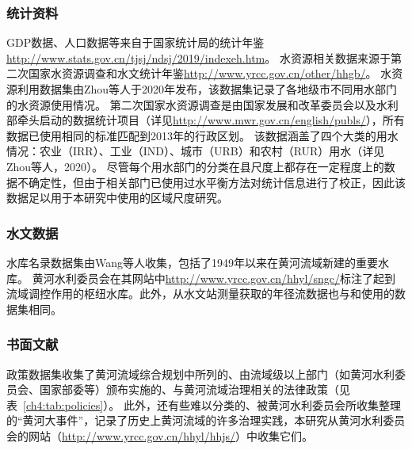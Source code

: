 \subsubsection{统计资料}
GDP数据、人口数据等来自于国家统计局的统计年鉴\url{http://www.stats.gov.cn/tjsj/ndsj/2019/indexeh.htm}。
水资源相关数据来源于第二次国家水资源调查\cite{zhou2020}和水文统计年鉴\url{http://www.yrcc.gov.cn/other/hhgb/}。
水资源利用数据集由Zhou等人于2020年\cite{zhou2020}发布，该数据集记录了各地级市不同用水部门的水资源使用情况。
第二次国家水资源调查是由国家发展和改革委员会以及水利部牵头启动的数据统计项目（详见\url{http://www.mwr.gov.cn/english/publs/}），所有数据已使用相同的标准匹配到2013年的行政区划。
该数据涵盖了四个大类的用水情况：农业（IRR）、工业（IND）、城市（URB）和农村（RUR）用水（详见Zhou等人，2020\cite{zhou2020}）。
尽管每个用水部门的分类在县尺度上都存在一定程度上的数据不确定性，但由于相关部门已使用过水平衡方法对统计信息进行了校正，因此该数据足以用于本研究中使用的区域尺度研究。

\subsubsection{水文数据}
水库名录数据集由Wang等人\cite{wang2019c}收集，包括了1949年以来在黄河流域新建的重要水库。
黄河水利委员会在其网站中\url{http://www.yrcc.gov.cn/hhyl/sngc/}标注了起到流域调控作用的枢纽水库。此外，从水文站测量获取的年径流数据也与\cite{wang2019c}和\cite{wang2016e}使用的数据集相同。

\subsubsection{书面文献}

政策数据集收集了黄河流域综合规划中所列的、由流域级以上部门（如黄河水利委员会、国家部委等）颁布实施的、与黄河流域治理相关的法律政策\cite{shuilibuhuangheshuiliweiyuanhui}（见表~\ref{ch4:tab:policies}）。
此外，还有些难以分类的、被黄河水利委员会所收集整理的“黄河大事件”，记录了历史上黄河流域的许多治理实践，本研究从黄河水利委员会的网站（\url{http://www.yrcc.gov.cn/hhyl/hhjs/}）中收集它们。


